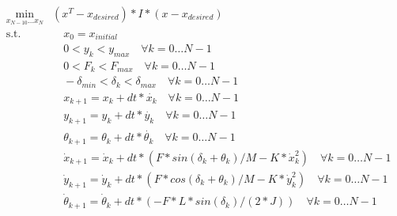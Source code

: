 \begin{equation}
    \begin{aligned}
    \min_{x_{N-10}\dots x_N} & (x^T - x_{desired}) * I * (x - x_{desired}) \\
    \text{s.t.} 
    & \quad x_0 = x_{initial} \\
    & \quad 0 < y_k < y_{max} \quad \forall k=0\dots N-1\\
    & \quad 0 < F_k < F_{max} \quad \forall k=0\dots N-1\\ 
    & \quad -\delta_{min} < \delta_k < \delta_{max} \quad \forall k=0\dots N-1\\ 
    & \quad x_{k+1} = x_k + dt * \dot{x_k} \quad \forall k=0\dots N-1\\
    & \quad y_{k+1} = y_k + dt * \dot{y_k} \quad \forall k=0\dots N-1\\
    & \quad \theta_{k+1} = \theta_k + dt * \dot{\theta_k} \quad \forall k=0\dots N-1\\
    & \quad \dot{x}_{k+1} = \dot{x}_k + dt * (F*sin(\delta_k + \theta_k) /M - K* \dot{x}_k^2) \quad \forall k=0\dots N-1 \\
    & \quad \dot{y}_{k+1} = \dot{y}_k + dt * (F*cos(\delta_k + \theta_k) /M - K* \dot{y}_k^2) \quad \forall k=0\dots N-1 \\
    & \quad \dot{\theta}_{k+1} = \dot{\theta}_k + dt * (-F * L*sin(\delta_k) / (2*J)) \quad \forall k=0\dots N-1 \\

    \end{aligned}
\end{equation}
    